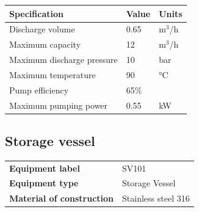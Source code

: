 \begin{table}[H]
\centering
\begin{tabular}{@{}l|l|l@{}}
\toprule
\textbf{Specification}                    & \textbf{Value} & \textbf{Units} \\ \midrule
Discharge volume                              & 0.65            & m$^3$/h            \\ \midrule
Maximum capacity                  & 12       &  m$^3$/h       \\ \midrule
Maximum discharge pressure       & 10         &     bar           \\ \midrule
Maximum temperature                  & 90     & °C         \\ \midrule
Pump efficiency \cite{pumps_and_systems_magazine_pump_2012}               & 65\%         &            \\ \midrule
Maximum pumping power                     & 0.55     & kW           \\ \bottomrule
\end{tabular}
\end{table}

\newpage
\subsection{Storage vessel}
\begin{table}[H]
    \centering
    \begin{tabular}{@{}l|l@{}}
    \toprule
      \textbf{Equipment label}  & SV101\\
       \textbf{Equipment type}  & Storage Vessel \\
       \textbf{Material of construction} & Stainless steel 316 \\
       \bottomrule
    \end{tabular}
\end{table}

